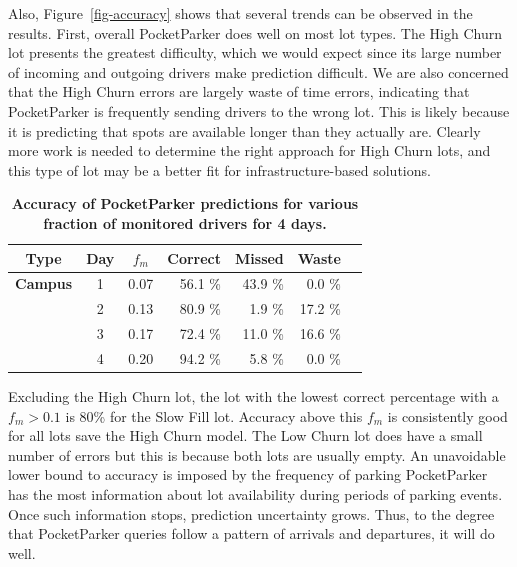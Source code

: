 \documentclass{sigchi}
\begin{document}
Also, Figure~\ref{fig-accuracy} shows that several trends can be observed in
the results. First, overall PocketParker does well on most lot types. The
High Churn lot presents the greatest difficulty, which we would expect since
its large number of incoming and outgoing drivers make prediction difficult.
We are also concerned that the High Churn errors are largely waste of time
errors, indicating that PocketParker is frequently sending drivers to the
wrong lot. This is likely because it is predicting that spots are available
longer than they actually are. Clearly more work is needed to determine the
right approach for High Churn lots, and this type of lot may be a better fit
for infrastructure-based solutions.
\begin{table}[t]
\begin{threeparttable}
{\small
\begin{tabularx}{\columnwidth}{Xccrrrr}
\multicolumn{1}{c}{\textbf{Type}} & 
\multicolumn{1}{c}{\textbf{Day}} & 
\multicolumn{1}{c}{\textbf{$f_m$}} & 
\multicolumn{1}{c}{\textbf{Correct}} & 
\multicolumn{1}{c}{\textbf{Missed}} & 
\multicolumn{1}{c}{\textbf{Waste}}\\ \toprule

\textbf{Campus} & 1 & 0.07 & 56.1 \% & 43.9 \% & 0.0 \% \\
& 2 & 0.13 & 80.9 \% & 1.9 \% & 17.2 \% \\
& 3 & 0.17 & 72.4 \% & 11.0 \% & 16.6 \% \\
& 4 & 0.20 & 94.2 \% & 5.8 \% & 0.0 \% \\
\end{tabularx}
}
\caption{\textbf{Accuracy of PocketParker predictions for various fraction of monitored drivers for 4 days.}}
\label{table-accuracy}
\end{threeparttable}
\end{table}



Excluding the High Churn lot, the lot with the lowest correct percentage with
a $f_m > 0.1$ is 80\% for the Slow Fill lot.  Accuracy above
this $f_m$ is consistently good for all lots save the High Churn model.  The
Low Churn lot does have a small number of errors but this is because both
lots are usually empty. An unavoidable lower bound to accuracy is imposed by
the frequency of parking PocketParker has the most information about lot
availability during periods of parking events. Once such information stops,
prediction uncertainty grows. Thus, to the degree that PocketParker queries
follow a pattern of arrivals and departures, it will do well.
\end{document}
